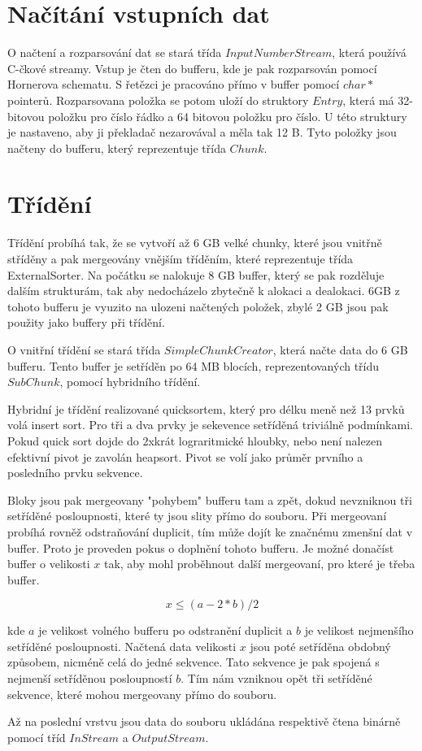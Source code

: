 \documentclass{article}
\begin{document}
\section*{Načítání vstupních dat}
O načtení a rozparsování dat se stará třída $InputNumberStream$, která používá C-čkové streamy.
Vstup je čten do bufferu, kde je pak rozparsován pomocí Hornerova schematu. S řetězci je pracováno
přímo v buffer pomocí $char*$ pointerů. Rozparsovana položka se potom uloží do struktory $Entry$, která 
má 32-bitovou položku pro číslo řádko a 64 bitovou položku pro číslo. U této struktury je nastaveno, 
aby ji překladač nezarovával a měla tak 12 B. Tyto položky jsou načteny do bufferu, který reprezentuje 
třída $Chunk$. 


\section*{Třídění}
Třídění probíhá tak, že se vytvoří až 6 GB velké chunky, které jsou vnitřně stříděny a pak mergeovány 
vnějším tříděním, které reprezentuje třída ExternalSorter.  Na počátku se nalokuje 8 GB buffer, který se pak rozděluje dalším strukturám, 
tak aby nedocházelo zbytečně k alokaci a dealokaci. 6GB z tohoto bufferu je vyuzito na ulozeni 
načtených položek, zbylé 2 GB jsou pak použity jako buffery při třídění. 

O vnitřní třídění se stará 
třída $SimpleChunkCreator$, která načte data do 6 GB bufferu. Tento buffer je setříděn po 64 MB blocích,
reprezentovaných třídu $SubChunk$, pomocí hybridního třídění. 

Hybridní je třídění realizované quicksortem,
který pro délku meně než 13 prvků volá insert sort. Pro tři a dva prvky je sekevence setříděná triviálně
podmínkami. Pokud quick sort dojde do 2xkrát lograritmické hloubky, nebo není nalezen efektivní pivot
je zavolán heapsort. Pivot se volí jako průměr prvního a posledního prvku sekvence. 

Bloky jsou pak mergeovany "pohybem" bufferu tam a zpět, dokud nevzniknou tři setříděné posloupnosti, které
ty jsou slity přímo do souboru. Při mergeovaní probíhá rovněž odstraňování duplicit, tím může dojít
ke značnému zmenšní dat v buffer. Proto je proveden pokus o doplnění tohoto bufferu. Je možné donačíst
buffer o velikosti $x$ tak, aby mohl proběhnout další mergeovaní, pro které je třeba buffer. 

$$ x \le (a - 2*b)/2 $$

kde $a$ je velikost volného bufferu po odstranění duplicit a $b$ je velikost nejmenšího setříděné posloupnosti.
Načtená data velikosti $x$ jsou poté setříděna obdobný způsobem, nicméně celá do jedné sekvence. Tato sekvence
je pak spojená s nejmenší setříděnou posloupností $b$. Tím nám vzniknou opět tři setříděné sekvence, které
mohou mergeovany přímo do souboru.

Až na poslední vrstvu jsou data do souboru ukládána respektivě čtena binárně pomocí tříd $InStream$ a $OutputStream$.
\end{document}
